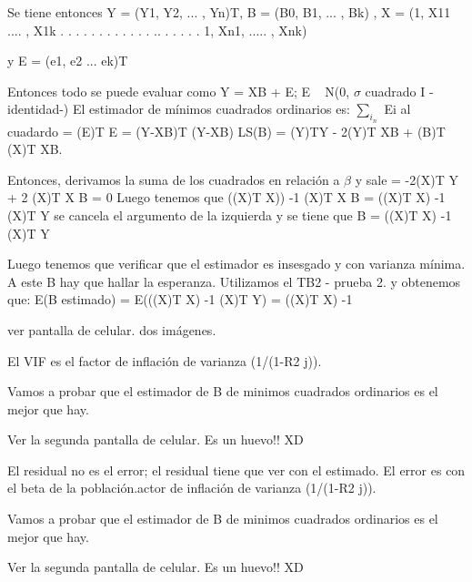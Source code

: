 \documentclass{article}
\begin{document}
Se tiene entonces Y = (Y1, Y2, ... , Yn)T, B = (B0, B1, ... , Bk) ,
X =  
(1, X11 .... , X1k
. . . . . . . .  . 
. . . .. . . . . .
1, Xn1, ..... , Xnk)

y E = (e1, e2 ... ek)T

Entonces todo se puede evaluar como Y = XB + E; E ~ N(0, $\sigma$ cuadrado I -identidad-)
El estimador de mínimos cuadrados ordinarios es: $\sum_{i_{n}}$ Ei al cuadardo = (E)T E = (Y-XB)T (Y-XB)
LS(B) = (Y)TY - 2(Y)T XB + (B)T (X)T XB.

Entonces, derivamos la suma de los cuadrados en relación a $\beta$ y sale = -2(X)T Y + 2 (X)T X B = 0
Luego tenemos que ((X)T X)) -1 (X)T X B = ((X)T X) -1 (X)T Y
se cancela el argumento de la izquierda y se tiene que B = ((X)T X) -1 (X)T Y

Luego tenemos que verificar que el estimador es insesgado y con varianza mínima. A este B hay que hallar la esperanza. Utilizamos el TB2 - prueba 2. y obtenemos que: E(B estimado) = E(((X)T X) -1 (X)T Y) = ((X)T X) -1 

ver pantalla de celular. dos imágenes.

El VIF es el factor de inflación de varianza (1/(1-R2 j)).

Vamos a probar que el estimador de B de minimos cuadrados ordinarios es el mejor que hay.

Ver la segunda pantalla de celular. Es un huevo!! XD

El residual no es el error; el residual tiene que ver con el estimado. El error es con el beta de la población.actor de inflación de varianza (1/(1-R2 j)).

Vamos a probar que el estimador de B de minimos cuadrados ordinarios es el mejor que hay.

Ver la segunda pantalla de celular. Es un huevo!! XD
\end{document}
